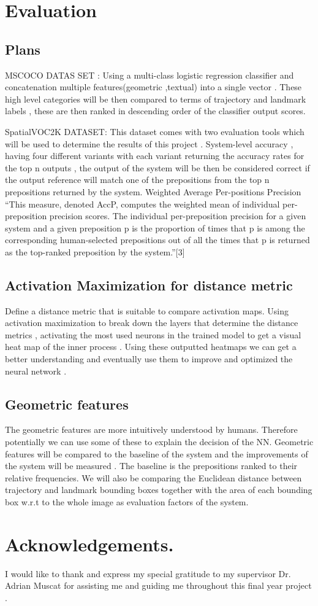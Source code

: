 \documentclass{csfyp}
\begin{document}
\section{Evaluation}
\subsection{Plans}
MSCOCO DATAS SET :
Using a multi-class logistic regression classifier and concatenation multiple features(geometric ,textual) into a single vector . These high level categories will be then compared to terms of trajectory and landmark labels , these are then ranked in descending order of the classifier output scores. 

SpatialVOC2K DATASET:
This dataset comes with two evaluation tools which will be used to determine the results of this project . 
System-level accuracy , having four different variants with each variant returning the accuracy rates for the top n outputs , the output of the system will be then be considered correct if the output reference will match one of the prepositions from the top n prepositions returned by the system.
Weighted Average Per-positions Precision “This measure, denoted AccP, computes the weighted mean of individual per-preposition precision scores. The individual per-preposition precision for a given system and a given preposition p is the proportion of times that p is among the corresponding human-selected prepositions out of all the times that p is returned as the top-ranked preposition by the system.”[3]

\subsection{Activation Maximization for distance metric}
Define a distance metric that is suitable to compare activation maps. Using activation maximization to break down the layers that determine the distance metrics , activating the most used neurons in the trained model to get a visual heat map of the inner process . Using these outputted heatmaps we can get a better understanding and eventually use them to improve and optimized the neural network .

\subsection{Geometric features}
The geometric features are more intuitively understood by humans. Therefore potentially we can use some of these to explain the decision of the NN. 
Geometric features will be compared to the baseline of the system and the improvements of the system will be measured . The baseline is the prepositions ranked to their relative frequencies. We will also be comparing the Euclidean distance between trajectory and landmark bounding boxes together with the area of each bounding box w.r.t to the whole image as evaluation factors of the system.
\cite{lu2016visual:1}

\section*{Acknowledgements.}
I would like to thank and express my special gratitude to my supervisor Dr. Adrian Muscat for assisting me and guiding me throughout this final year project .
\end{document}
